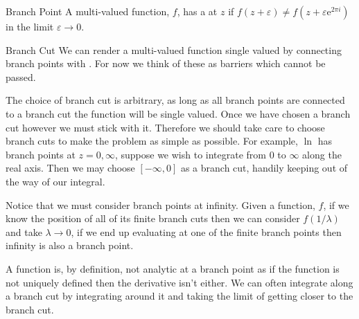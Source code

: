 \documentclass[fleqn]{NotesClass}
\newcommand*{\e}{\mathrm{e}}
\begin{document}
    \begin{dfn}{Branch Point}{}
        A multi-valued function, \(f\), has a  at \(z\) if \(f(z + \varepsilon) \ne f(z + \varepsilon\e^{2\pi i})\) in the limit \(\varepsilon \to 0\).
    \end{dfn}
    
    \begin{dfn}{Branch Cut}{}
        We can render a multi-valued function single valued by connecting branch points with .
        For now we think of these as barriers which cannot be passed.
    \end{dfn}
    
    The choice of branch cut is arbitrary, as long as all branch points are connected to a branch cut the function will be single valued.
    Once we have chosen a branch cut however we must stick with it.
    Therefore we should take care to choose branch cuts to make the problem as simple as possible.
    For example, \(\ln\) has branch points at \(z = 0, \infty\), suppose we wish to integrate from \(0\) to \(\infty\) along the real axis.
    Then we may choose \([-\infty, 0]\) as a branch cut, handily keeping out of the way of our integral.
    
    Notice that we must consider branch points at infinity.
    Given a function, \(f\), if we know the position of all of its finite branch cuts then we can consider \(f(1/\lambda)\) and take \(\lambda \to 0\), if we end up evaluating at one of the finite branch points then infinity is also a branch point.
    
    A function is, by definition, not analytic at a branch point as if the function is not uniquely defined then the derivative isn't either.
    We can often integrate along a branch cut by integrating around it and taking the limit of getting closer to the branch cut.
    
\end{document}
